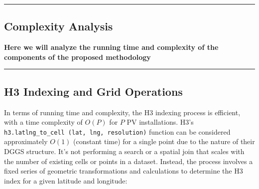 {\color{gray}\hrule}
\begin{center}
\section{Complexity Analysis}
\textbf{Here we will analyze the running time and complexity of the components of the proposed methodology}
\bigskip
\end{center}
{\color{gray}\hrule}
\subsection{H3 Indexing and Grid Operations}
In terms of running time and complexity, the H3 indexing process is efficient, with a time complexity of $O(P)$ for $P$ PV installations.
H3's \texttt{h3.latlng\string_to\string_cell (lat, lng, resolution)} function can be considered approximately $O(1)$ (constant time) for a single point due to the nature of their DGGS structure.
It's not performing a search or a spatial join that scales with the number of existing cells or points in a dataset. 
Instead, the process involves a fixed series of geometric transformations and calculations to determine the H3 index for a given latitude and longitude\cite{H3_Algorithm1}: 

